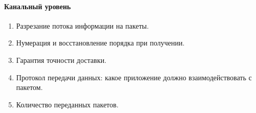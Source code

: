 \documentclass[a4paper,12pt]{article}
\begin{document}
\paragraph{Канальный уровень}
\begin{enumerate}
	\item Разрезание потока информации на пакеты.
	\item Нумерация и восстановление порядка при получении.
	\item Гарантия точности доставки.
	\item Протокол передачи данных: какое приложение должно взаимодействовать с пакетом.
	\item Количество переданных пакетов.
\end{enumerate}	
\end{document}
